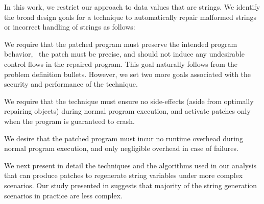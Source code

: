 
In this work, we restrict our approach to data values that are strings. We
identify the broad design goals for a technique to automatically repair
malformed strings or incorrect handling of strings as follows:


 We require that the patched program must
preserve the intended program behavior, \ie\ the patch must be precise, and
should not induce any undesirable control flows in the repaired program. 
This goal naturally follows from the problem definition bullets. However, we
set two more goals associated with the security and performance of the
technique.

 We require that the technique
must ensure no side-effects (aside from optimally repairing objects) during
normal program execution, and activate patches only when the program is
guaranteed to crash.

 We desire that the patched program must
incur no runtime overhead during normal program execution, and only negligible
overhead in case of failures.

We next present in detail the techniques and the algorithms used in our analysis
that can produce patches to regenerate string variables under more complex
scenarios. Our study presented in  suggests that majority of
the string generation scenarios in practice are less complex.
